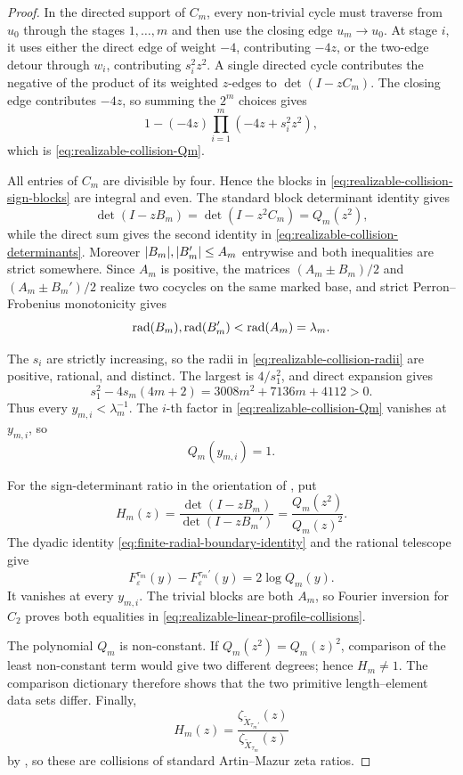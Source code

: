 \begin{proof}
In the directed support of \(C_m\), every non-trivial cycle must traverse
from \(u_0\) through the stages \(1,\ldots,m\) and then use the closing edge
\(u_m\to u_0\).  At stage \(i\), it uses either the direct edge of weight
\(-4\), contributing \(-4z\), or the two-edge detour through \(w_i\),
contributing \(s_i^2z^2\).  A single directed cycle contributes the negative
of the product of its weighted \(z\)-edges to \(\det(I-zC_m)\).  The closing
edge contributes \(-4z\), so summing the \(2^m\) choices gives
\[
 1-(-4z)\prod_{i=1}^m(-4z+s_i^2z^2),
\]
which is \eqref{eq:realizable-collision-Qm}.

All entries of \(C_m\) are divisible by four.  Hence the blocks in
\eqref{eq:realizable-collision-sign-blocks} are integral and even.  The
standard block determinant identity gives
\[
 \det(I-zB_m)=\det(I-z^2C_m)=Q_m(z^2),
\]
while the direct sum gives the second identity in
\eqref{eq:realizable-collision-determinants}.  Moreover
\(\lvert B_m \rvert,\lvert B_m' \rvert\le A_m\) entrywise and both inequalities are strict
somewhere.  Since \(A_m\) is positive, the matrices
\((A_m\pm B_m)/2\) and \((A_m\pm B_m')/2\) realize two cocycles on the same
marked base, and strict Perron--Frobenius monotonicity gives
\[
 \operatorname{rad}(B_m),\operatorname{rad}(B_m')<\operatorname{rad}(A_m)=\lambda_m.
\]

The \(s_i\) are strictly increasing, so the radii in
\eqref{eq:realizable-collision-radii} are positive, rational, and distinct.
The largest is \(4/s_1^2\), and direct expansion gives
\[
 s_1^2-4s_m(4m+2)
 =3008m^2+7136m+4112>0.
\]
Thus every \(y_{m,i}<\lambda_m^{-1}\).  The \(i\)-th factor in
\eqref{eq:realizable-collision-Qm} vanishes at \(y_{m,i}\), so
\[
 Q_m(y_{m,i})=1.
\]

For the sign-determinant ratio in the orientation of
, put
\[
 H_m(z)=\frac{\det(I-zB_m)}{\det(I-zB_m')}
 =\frac{Q_m(z^2)}{Q_m(z)^2}.
\]
The dyadic identity \eqref{eq:finite-radial-boundary-identity} and the
rational telescope give
\[
 F_\varepsilon^{\tau_m}(y)-F_\varepsilon^{\tau_m'}(y)
 =2\log Q_m(y).
\]
It vanishes at every \(y_{m,i}\).  The trivial blocks are both \(A_m\), so
Fourier inversion for \(C_2\) proves both equalities in
\eqref{eq:realizable-linear-profile-collisions}.

The polynomial \(Q_m\) is non-constant.  If
\(Q_m(z^2)=Q_m(z)^2\), comparison of the least non-constant term would give
two different degrees; hence \(H_m\ne1\).  The comparison dictionary therefore
shows that the two primitive length--element data sets differ.  Finally,
\[
 H_m(z)=
 \frac{\zeta_{\widetilde X_{\tau_m'}}(z)}
      {\zeta_{\widetilde X_{\tau_m}}(z)}
\]
by , so these are collisions of standard
Artin--Mazur zeta ratios.
\end{proof}

